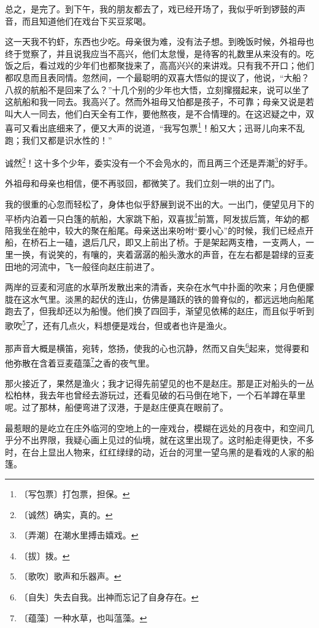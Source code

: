 \documentclass[12pt,UTF-8,openany]{ctexbook}
\begin{document}
\begin{large}
    总之，是完了。到下午，我的朋友都去了，戏已经开场了，我似乎听到锣鼓的声音，而且知道他们在戏台下买豆浆喝。
    
    这一天我不钓虾，东西也少吃。母亲很为难，没有法子想。到晚饭时候，外祖母也终于觉察了，并且说我应当不高兴，他们太怠慢，是待客的礼数里从来没有的。吃饭之后，看过戏的少年们也都聚拢来了，高高兴兴的来讲戏。只有我不开口；他们都叹息而且表同情。忽然间，一个最聪明的双喜大悟似的提议了，他说，“大船？八叔的航船不是回来了么？”十几个别的少年也大悟，立刻撺掇起来，说可以坐了这航船和我一同去。我高兴了。然而外祖母又怕都是孩子，不可靠；母亲又说是若叫大人一同去，他们白天全有工作，要他熬夜，是不合情理的。在这迟疑之中，双喜可又看出底细来了，便又大声的说道，“我写包票\footnote{〔写包票〕打包票，担保。}！船又大；迅哥儿向来不乱跑；我们又都是识水性的！”
    
    诚然\footnote{〔诚然〕确实，真的。}！这十多个少年，委实没有一个不会凫水的，而且两三个还是弄潮\footnote{〔弄潮〕在潮水里搏击嬉戏。}的好手。
    
    外祖母和母亲也相信，便不再驳回，都微笑了。我们立刻一哄的出了门。
    
    我的很重的心忽而轻松了，身体也似乎舒展到说不出的大。一出门，便望见月下的平桥内泊着一只白篷的航船，大家跳下船，双喜拔\footnote{〔拔〕拨。}前篙，阿发拔后篙，年幼的都陪我坐在舱中，较大的聚在船尾。母亲送出来吩咐“要小心”的时候，我们已经点开船，在桥石上一磕，退后几尺，即又上前出了桥。于是架起两支橹，一支两人，一里一换，有说笑的，有嚷的，夹着潺潺的船头激水的声音，在左右都是碧绿的豆麦田地的河流中，飞一般径向赵庄前进了。
    
    两岸的豆麦和河底的水草所发散出来的清香，夹杂在水气中扑面的吹来；月色便朦胧在这水气里。淡黑的起伏的连山，仿佛是踊跃的铁的兽脊似的，都远远地向船尾跑去了，但我却还以为船慢。他们换了四回手，渐望见依稀的赵庄，而且似乎听到歌吹\footnote{〔歌吹〕歌声和乐器声。}了，还有几点火，料想便是戏台，但或者也许是渔火。
    
    那声音大概是横笛，宛转，悠扬，使我的心也沉静，然而又自失\footnote{〔自失〕失去自我。出神而忘记了自身存在。}起来，觉得要和他弥散在含着豆麦蕴藻\footnote{〔蕴藻〕一种水草，也叫蕰藻。}之香的夜气里。
    
    那火接近了，果然是渔火；我才记得先前望见的也不是赵庄。那是正对船头的一丛松柏林，我去年也曾经去游玩过，还看见破的石马倒在地下，一个石羊蹲在草里呢。过了那林，船便弯进了汊港，于是赵庄便真在眼前了。
    
    最惹眼的是屹立在庄外临河的空地上的一座戏台，模糊在远处的月夜中，和空间几乎分不出界限，我疑心画上见过的仙境，就在这里出现了。这时船走得更快，不多时，在台上显出人物来，红红绿绿的动，近台的河里一望乌黑的是看戏的人家的船篷。
    

\end{large}
\end{document}
